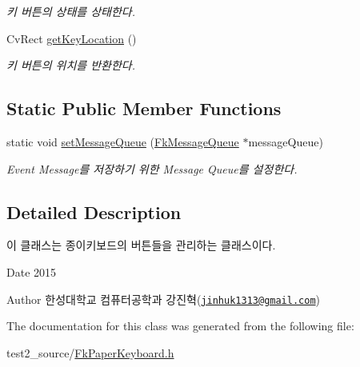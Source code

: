 \begin{DoxyCompactItemize}
\begin{DoxyCompactList}\small\item\em 키 버튼의 상태를 상태한다. \end{DoxyCompactList}\item 
\hypertarget{class_fk_key_button_a9443f56d6bd2a5e38d1f005d8eeda58d}{}Cv\+Rect \hyperlink{class_fk_key_button_a9443f56d6bd2a5e38d1f005d8eeda58d}{get\+Key\+Location} ()\label{class_fk_key_button_a9443f56d6bd2a5e38d1f005d8eeda58d}

\begin{DoxyCompactList}\small\item\em 키 버튼의 위치를 반환한다. \end{DoxyCompactList}\end{DoxyCompactItemize}
\subsection*{Static Public Member Functions}
\begin{DoxyCompactItemize}
\item 
\hypertarget{class_fk_key_button_ac1e9f07d5499768e14afa978eb25f541}{}static void \hyperlink{class_fk_key_button_ac1e9f07d5499768e14afa978eb25f541}{set\+Message\+Queue} (\hyperlink{class_fk_message_queue}{Fk\+Message\+Queue} $\ast$message\+Queue)\label{class_fk_key_button_ac1e9f07d5499768e14afa978eb25f541}

\begin{DoxyCompactList}\small\item\em Event Message를 저장하기 위한 Message Queue를 설정한다. \end{DoxyCompactList}\end{DoxyCompactItemize}


\subsection{Detailed Description}
이 클래스는 종이키보드의 버튼들을 관리하는 클래스이다. 

\begin{DoxyDate}{Date}
2015 
\end{DoxyDate}
\begin{DoxyAuthor}{Author}
한성대학교 컴퓨터공학과 강진혁(\href{mailto:jinhuk1313@gmail.com}{\tt jinhuk1313@gmail.\+com}) 
\end{DoxyAuthor}


The documentation for this class was generated from the following file\+:\begin{DoxyCompactItemize}
\item 
test2\+\_\+source/\hyperlink{_fk_paper_keyboard_8h}{Fk\+Paper\+Keyboard.\+h}\end{DoxyCompactItemize}
